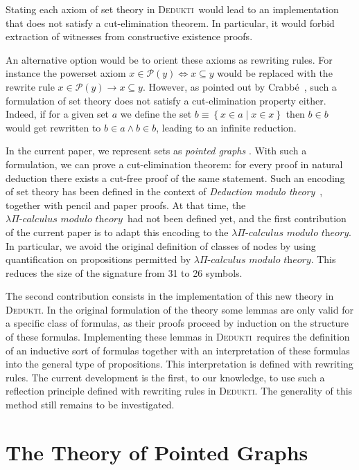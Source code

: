 \documentclass[submission,copyright,creativecommons]{eptcs}
\def\lra{\longrightarrow}
\newcommand{\dedukti}{\textsc{Dedukti}}
\newcommand{\lpcm}{$\lambda \Pi\textit{-calculus modulo theory}$}
\begin{document}
Stating each axiom of set theory in \dedukti ~would lead to an implementation that does not satisfy a cut-elimination theorem. In particular, it would forbid extraction of witnesses from constructive existence proofs.

An alternative option would be to orient these axioms as rewriting rules. For instance the powerset axiom $x \in \mathcal{P}(y) \Leftrightarrow x \subseteq y$ would be replaced with the rewrite rule $x \in \mathcal{P}(y) \lra x \subseteq y$. However, as pointed out by Crabbé~\cite{crabbe}, such a formulation of set theory does not satisfy a cut-elimination property either. Indeed, if for a given set $a$ we define the set $b\equiv\left\{x\in a\middle|x\in x\right\}$ then $b\in b$ would get rewritten to $b\in a\wedge b\in b$, leading to an infinite reduction.

In the current paper, we represent sets as \textit{pointed graphs} \cite{pointed}. With such a formulation, we can prove a cut-elimination theorem: for every proof in natural deduction there exists a cut-free proof of the same statement. Such an encoding of set theory has been defined in the context of \textit{Deduction modulo theory}~\cite{zermodulo}, together with pencil and paper proofs. At that time, the \lpcm ~had not been defined yet, and the first contribution of the current paper is to adapt this encoding to the \lpcm. In particular, we avoid the original definition of classes of nodes by using quantification on propositions permitted by \lpcm. This reduces the size of the signature from 31 to 26 symbols.

The second contribution consists in the implementation of this new theory in \dedukti. In the original formulation of the theory some lemmas are only valid for a specific class of formulas, as their proofs proceed by induction on the structure of these formulas. Implementing these lemmas in \dedukti ~requires the definition of an inductive sort of formulas together with an interpretation of these formulas into the general type of propositions. This interpretation is defined with rewriting rules. The current development is the first, to our knowledge, to use such a reflection principle defined with rewriting rules in \dedukti. The generality of this method still remains to be investigated.

\section{The Theory of Pointed Graphs}
\end{document}
